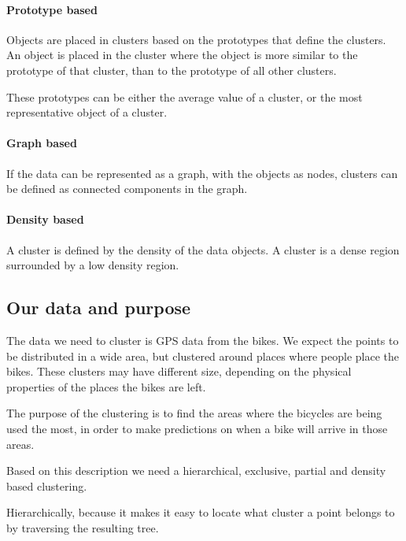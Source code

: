 \paragraph{Prototype based}
Objects are placed in clusters based on the prototypes that define the clusters.
An object is placed in the cluster where the object is more similar to the prototype of that cluster, than to the prototype of all other clusters.

These prototypes can be either the average value of a cluster, or the most representative object of a cluster.

\paragraph{Graph based}
If the data can be represented as a graph, with the objects as nodes, clusters can be defined as connected components in the graph.

\paragraph{Density based}
A cluster is defined by the density of the data objects.
A cluster is a dense region surrounded by a low density region.

\subsection{Our data and purpose}\label{data_purporse}
The data we need to cluster is GPS data from the bikes.
We expect the points to be distributed in a wide area, but clustered around places where people place the bikes.
These clusters may have different size, depending on the physical properties of the places the bikes are left.

The purpose of the clustering is to find the areas where the bicycles are being used the most, in order to make predictions on when a bike will arrive in those areas.

Based on this description we need a hierarchical, exclusive, partial and density based clustering.

Hierarchically, because it makes it easy to locate what cluster a point belongs to by traversing the resulting tree.


